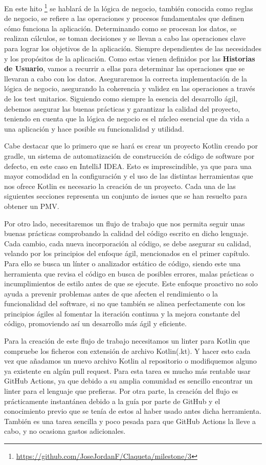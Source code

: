 En este hito \footnote{\url{https://github.com/JoseJordanF/Claqueta/milestone/3}} se hablará de la 
lógica de negocio, también conocida como reglas de negocio, se refiere a las operaciones y procesos 
fundamentales que definen cómo funciona la aplicación. Determinando como se procesan los datos, se 
realizan cálculos, se toman decisiones y se llevan a cabo las operaciones clave para lograr los 
objetivos de la aplicación. Siempre dependientes de las necesidades y los propósitos de la aplicación. 
Como estas vienen definidos por las \textbf{Historias de Usuario}, vamos a recurrir a ellas para 
determinar las operaciones que se llevaran a cabo con los datos. Aseguraremos la correcta 
implementación de la lógica de negocio, asegurando la coherencia y validez en las operaciones a través 
de los test unitarios. Siguiendo como siempre la esencia del desarrollo ágil, debemos asegurar las
buenas prácticas y garantizar la calidad del proyecto, teniendo en cuenta que la lógica de negocio es 
el núcleo esencial que da vida a una aplicación y hace posible su funcionalidad y utilidad. 

Cabe destacar que lo primero que se hará es crear un proyecto Kotlin creado por gradle, un sistema de 
automatización de construcción de código de software por defecto, en este caso en IntelliJ IDEA. Esto 
es imprescindible, ya que para una mayor comodidad en la configuración y el uso de las distintas 
herramientas que nos ofrece Kotlin es necesario la creación de un proyecto.
Cada una de las siguientes secciones representa un conjunto de issues que se han resuelto para obtener 
un PMV.

Por otro lado, necesitaremos un flujo de trabajo que nos permita seguir unas buenas prácticas comprobando
la calidad del código escrito en dicho lenguaje. Cada cambio, cada nueva incorporación al código, se debe asegurar
su calidad, velando por los principios del enfoque ágil, mencionados en el primer capítulo. Para ello se busca un 
línter o analizador estático de código, siendo este una herramienta que revisa el código en busca de posibles 
errores, malas prácticas o incumplimientos de estilo antes de que se ejecute. Este enfoque proactivo no solo 
ayuda a prevenir problemas antes de que afecten el rendimiento o la funcionalidad del software, si no que 
también se alinea perfectamente con los principios ágiles al fomentar la iteración continua y la mejora 
constante del código, promoviendo así un desarrollo más ágil y eficiente. 

Para la creación de este flujo de trabajo necesitamos un linter para Kotlin que compruebe los ficheros con 
extensión de archivo Kotlin(.kt). Y hacer esto cada vez que añadamos un nuevo archivo Kotlin al repositorio 
o modifiquemos alguno ya existente en algún pull request. Para esta tarea es mucho más rentable usar GitHub 
Actions, ya que debido a su amplia comunidad es sencillo encontrar un linter para el lenguaje que prefieras. 
Por otra parte, la creación del flujo es prácticamente instantánea debido a la guía por parte de GitHub y el conocimiento previo que se tenía de estos al haber usado antes dicha herramienta. 
También es una tarea sencilla y poco pesada para que GitHub Actions la lleve a cabo, y no ocasiona gastos 
adicionales.

